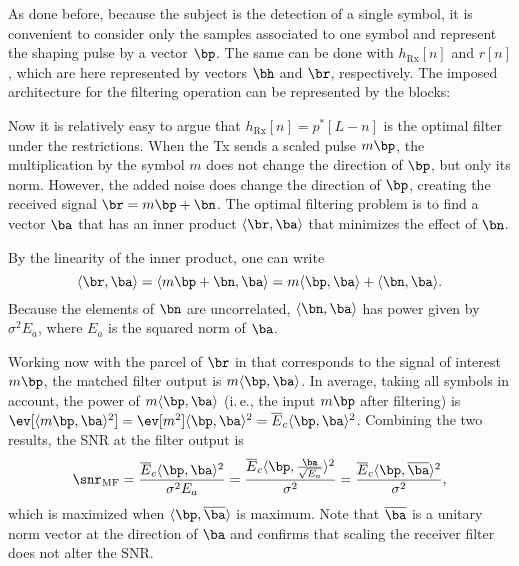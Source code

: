 
As done before, because the subject is the detection of a single symbol, it is convenient to consider only the samples associated to one symbol and represent the shaping pulse by a vector $\bp$. The same can be done with $h_\textrm{Rx}[n]$ and $r[n]$, which are here represented by vectors $\bh$ and $\br$, respectively. 
The imposed architecture for the filtering operation can be represented by the blocks:


Now it is relatively easy to argue that $h_\textrm{Rx}[n]=p^*[L-n]$ 
is the optimal filter under the restrictions.
When the Tx sends a scaled pulse $m \bp$, the multiplication by the symbol $m$ does not change the direction of $\bp$, but only its norm. However, the added noise does change the direction of $\bp$, creating the received signal $\br = m\bp + \bn$. The optimal filtering problem is to find a vector $\ba$ that has an inner product $\langle\br,\ba \rangle $ that minimizes the effect of $\bn$.

By the linearity of the inner product, one can write 
\begin{equation}
\langle\br,\ba \rangle  = \langle m \bp + \bn, \ba \rangle  = m\langle\bp,\ba \rangle  + \langle\bn,\ba \rangle .
\label{eq:mfparcels}
\end{equation}
Because the elements of $\bn$ are uncorrelated, $\langle\bn,\ba \rangle$ has power given by $\sigma^2 E_a$, where $E_a$ is the squared norm of $\ba$.

Working now with the parcel of $\br$ in  that corresponds to the signal of interest $m \bp$, the matched filter output is $m \langle\bp,\ba \rangle $.
In average, taking all symbols in account, the power of $m \langle\bp,\ba \rangle $ (i.\,e., the input $m \bp$ after filtering) is $\ev[\langle m \bp,\ba \rangle ^2]=\ev[m^2]\langle\bp,\ba \rangle ^2=\overline E_c \langle\bp,\ba \rangle ^2$.
Combining the two results, the SNR at the filter output is
\[
\snr_\textrm{MF} = \frac{\overline E_c \langle\bp,\ba \rangle ^2}{\sigma^2 E_a} = \frac{\overline E_c\langle\bp,\frac{\ba}{\sqrt{E_a}} \rangle ^2}{\sigma^2} =
\frac{\overline E_c\langle\bp,\overline \ba \rangle ^2}{\sigma^2},
\]
which is maximized when $\langle\bp,\overline \ba \rangle $ is maximum. Note that $\overline \ba$ is a unitary norm vector at the direction of $\ba$ and confirms that scaling the receiver filter does not alter the SNR.

